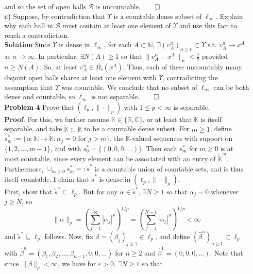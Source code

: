 \documentclass[10pt]{article}
\newcommand{\mbb}[1]{\mathbb{#1}}
\newcommand{\1}[1]{\mathbbm{1}_{#1}}
\newcommand{\mc}[1]{\mathcal{#1}}
\begin{document}
    and so the set of open balls $\mc{B}$ is uncountable.\hfill{$\qed$}\\[5pt]
    {\bf c)} Suppose, by contradiction that $\Upsilon$ is a countable dense subset of $\ell_\infty$. Explain why each ball in $\mc{B}$
    must contain at least one element of $\Upsilon$ and use this fact to reach a contradiction.\\[5pt]
    {\bf Solution} Since $\Upsilon$ is dense in $\ell_\infty$, for each $A\subset\mbb{N}$, $\exists(\upsilon^n_A)_{n\geq 1}\subset\Upsilon$ s.t. $\upsilon^n_A\rightarrow x^A$ as $n\rightarrow\infty$.
    In particular, $\exists N(A)\geq 1$ so that $\|\upsilon^n_A-x^A\|_\infty<\tfrac{1}{2}$ provided $n\geq N(A)$. So, at least $\upsilon^n_A\in B_r(x^A)$. Thus, each of these uncountably many
    disjoint open balls shares at least one element with $\Upsilon$, contradicting the assumption that $\Upsilon$ was countable. We conclude that no subset of $\ell_\infty$ can be both dense
    and countable, so $\ell_\infty$ is not separable.\hfill{$\qed$}\\[5pt]
    {\bf Problem 4} Prove that $(\ell_p,\|\cdot\|_p)$ with $1\leq p<\infty$ is separable.\\[5pt]
    {\bf Proof}. For this, we further assume $\mbb{K}\in\{\mbb{R},\mbb{C}\}$, or at least that $\mbb{K}$ is itself separable, and take $\widetilde{\mbb{K}}\subset\mbb{K}$ to be a countable dense subset.
    For $m\geq 1$, define $s^\ast_m:=\{\alpha:\mbb{N}\rightarrow\widetilde{\mbb{K}}:\alpha_j=0$ for $j>m\}$, the $\widetilde{\mbb{K}}$-valued sequences with support on $\{1,2,\dots,m-1\}$, and with $s^\ast_0=\{(0,0,0,\dots)\}$.
    Then each $s^\ast_m$ for $m\geq 0$ is at most countable, since every element can be associated with an entry of $\widetilde{\mbb{K}}^{m}$. Furthermore, $\cup_{m\geq 0}s^\ast_m=:\widetilde{s}^\ast$ is a countable union of countable sets, and is thus itself
    countable. I claim that $\widetilde{s}^\ast$ is dense in $(\ell_p,\|\cdot\|_p)$.\\[5pt]
    First, show that $\widetilde{s}^\ast\subseteq\ell_p$. But for any $\alpha\in\widetilde{s}^\ast$, $\exists N\geq 1$ so that $\alpha_j=0$ whenever $j\geq N$, so
    \[\|\alpha\|_p=(\sum_{j=1}^\infty|\alpha_j|^p)^{1/p}=(\sum_{j=1}^{N-1}|\alpha_j|^p)^{1/p}<\infty\]
    and $\widetilde{s}^\ast\subseteq\ell_p$ follows. Now, fix $\beta=(\beta_j)_{j\geq 1}\in\ell_p$, and define $(\hat{\beta}^n)_{n\geq 1}\subset\ell_p$ with $\hat{\beta}^n=(\beta_1,\beta_2,\dots,\beta_{n-1},0,0,\dots)$ for $n\geq 2$ and $\hat{\beta}^1=(0,0,0,\dots)$.
    Note that since $\|\beta\|_p<\infty$, we have for $\varepsilon>0$, $\exists N\geq 1$ so that
\end{document}
